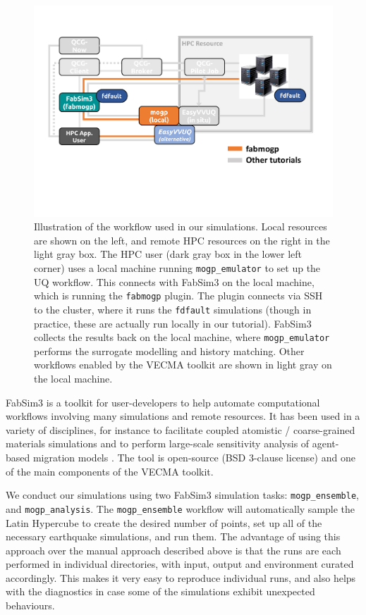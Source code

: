 \documentclass[openacc]{rstransa}%
\begin{document}
\begin{figure}[!h]
\centering\includegraphics[width=5in]{FabMogpMap.pdf}
\caption{Illustration of the workflow used in our simulations. Local resources are shown on the
left, and remote HPC resources on the right in the light gray box. The HPC user (dark gray box in
the lower left corner) uses a local machine running \texttt{mogp\_emulator} to set up the
UQ workflow. This connects with FabSim3 on the local machine, which is running the
\texttt{fabmogp} plugin. The plugin
connects via SSH to the cluster, where it runs the \texttt{fdfault} simulations (though
in practice, these are actually run locally in our tutorial). FabSim3 collects the results
back on the local machine, where \texttt{mogp\_emulator} performs the surrogate modelling
and history matching.
Other workflows enabled by the VECMA toolkit are shown in light gray on the local machine.}
\label{tubemap}
\end{figure}

FabSim3 is a toolkit for user-developers to help automate computational workflows involving many simulations and remote resources. It has been used in a variety of disciplines, for instance to facilitate coupled atomistic / coarse-grained materials simulations and to perform large-scale sensitivity analysis of agent-based migration models \cite{fabsim}. The tool is open-source (BSD 3-clause license) and one of the main components of the VECMA toolkit.

We conduct our simulations using two FabSim3 simulation tasks: \texttt{mogp\_ensemble}, and
\texttt{mogp\_analysis}.
The \texttt{mogp\_ensemble} workflow will automatically sample the Latin Hypercube to create the desired number of points, set up all of the necessary earthquake simulations, and run them. The advantage of using this approach over the manual approach described above is that the runs are each performed in individual directories, with input, output and environment curated accordingly. This makes it very easy to reproduce individual runs, and also helps with the diagnostics in case some of the simulations exhibit unexpected behaviours.
\end{document}
